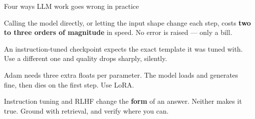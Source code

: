 \documentclass[aspectratio=169,11pt,t]{beamer}
\begin{document}
\begin{frame}[shrink=25]{Four ways LLM work goes wrong in practice}
\begin{minipage}[t]{0.494\textwidth}
\begin{icardbad}
Calling the model directly, or letting the input shape change each step, costs \textbf{two to three orders of magnitude} in speed. No error is raised --- only a bill.
\end{icardbad}
\end{minipage}%
\hfill
\begin{minipage}[t]{0.494\textwidth}
\begin{icardbad}
An instruction-tuned checkpoint expects the exact template it was tuned with. Use a different one and quality drops sharply, silently.
\end{icardbad}
\end{minipage}%


\vskip 4pt

\begin{minipage}[t]{0.494\textwidth}
\begin{icardwarn}
Adam needs three extra floats per parameter. The model loads and generates fine, then  dies on the first step. Use LoRA.
\end{icardwarn}
\end{minipage}%
\hfill
\begin{minipage}[t]{0.494\textwidth}
\begin{icardwarn}
Instruction tuning and RLHF change the \textbf{form} of an answer. Neither makes it true. Ground with retrieval, and verify where you can.
\end{icardwarn}
\end{minipage}%
\end{frame}
\end{document}
